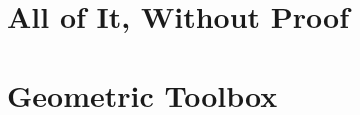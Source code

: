 \frontmatter




\mainmatter



\part{All of It, Without Proof}


\part{Geometric Toolbox}\label{sec:preliminaries}


\appendix


%
%

\backmatter
{}
{}


{}
\listoftheorems
